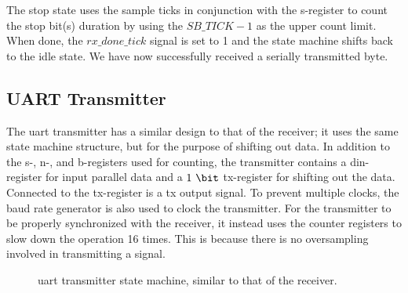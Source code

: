 \documentclass[main.tex]{subfiles}
\begin{document}
The stop state uses the sample ticks in conjunction with the s-register to count the stop bit(s) duration by using the $SB\_TICK-1$ as the upper count limit. When done, the  $rx\_done\_tick$ signal is set to 1 and the state machine shifts back to the idle state. We have now successfully received a serially  transmitted byte. %

\subsection{UART Transmitter}
The \gls{uart} transmitter has a similar design to that of the receiver; it uses the same state machine structure, but for the purpose of shifting out data. In addition to the s-, n-, and b-registers used for counting, the transmitter contains a din-register for input parallel data and a $1~\bit$ tx-register for shifting out the data. Connected to the tx-register is a tx output signal. To prevent multiple clocks, the baud rate generator is also used to clock the transmitter. For the transmitter to be properly synchronized with the receiver, it instead uses the counter registers to slow down the operation 16 times. This is because there is no oversampling involved in transmitting a signal.\\

\begin{figure}[!htp]
\begin{center}
\caption{\gls{uart} transmitter state machine, similar to that of the receiver.}
\label{fig:uarttx}
\end{center}
\end{figure}
\end{document}
